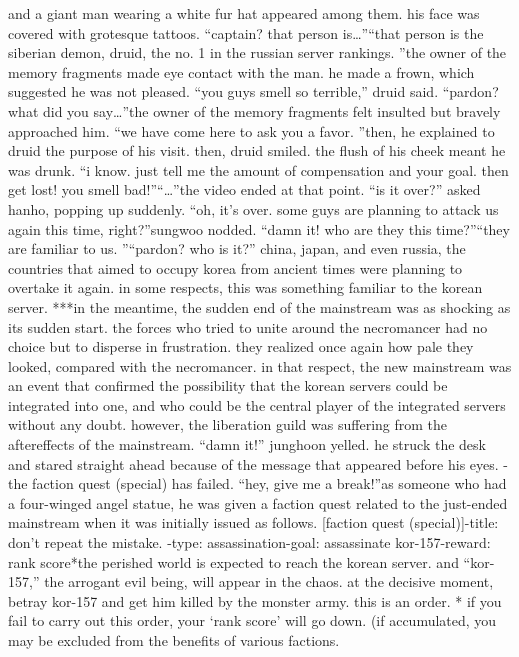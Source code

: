 and a giant man wearing a white fur hat appeared among them.
 his face was covered with grotesque tattoos.
“captain? that person is…”“that person is the siberian demon, druid, the no.
 1 in the russian server rankings.
”the owner of the memory fragments made eye contact with the man.
he made a frown, which suggested he was not pleased.
“you guys smell so terrible,” druid said.
“pardon? what did you say…”the owner of the memory fragments felt insulted but bravely approached him.
“we have come here to ask you a favor.
”then, he explained to druid the purpose of his visit.
then, druid smiled.
 the flush of his cheek meant he was drunk.
“i know.
 just tell me the amount of compensation and your goal.
 then get lost! you smell bad!”“…”the video ended at that point.
“is it over?” asked hanho, popping up suddenly.
 “oh, it’s over.
 some guys are planning to attack us again this time, right?”sungwoo nodded.
“damn it! who are they this time?”“they are familiar to us.
”“pardon? who is it?”
china, japan, and even russia, the countries that aimed to occupy korea from ancient times were planning to overtake it again.
 in some respects, this was something familiar to the korean server.
***in the meantime, the sudden end of the mainstream was as shocking as its sudden start.
the forces who tried to unite around the necromancer had no choice but to disperse in frustration.
 they realized once again how pale they looked, compared with the necromancer.
in that respect, the new mainstream was an event that confirmed the possibility that the korean servers could be integrated into one, and who could be the central player of the integrated servers without any doubt.
however, the liberation guild was suffering from the aftereffects of the mainstream.
“damn it!” junghoon yelled.
he struck the desk and stared straight ahead because of the message that appeared before his eyes.
-the faction quest (special) has failed.
“hey, give me a break!”as someone who had a four-winged angel statue, he was given a faction quest related to the just-ended mainstream when it was initially issued as follows.
[faction quest (special)]-title: don’t repeat the mistake.
-type: assassination-goal: assassinate kor-157-reward: rank score*the perished world is expected to reach the korean server.
 and “kor-157,” the arrogant evil being, will appear in the chaos.
 at the decisive moment, betray kor-157 and get him killed by the monster army.
 this is an order.
* if you fail to carry out this order, your ‘rank score’ will go down.
 (if accumulated, you may be excluded from the benefits of various factions.
